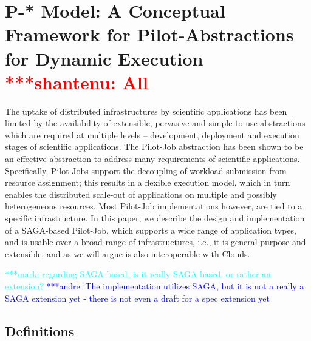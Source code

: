 \documentclass[conference,final]{IEEEtran}
\newcommand{\jhanote}[1]{ {\textcolor{red} { ***shantenu: #1 }}}
\newcommand{\alnote}[1]{ {\textcolor{blue} { ***andre: #1 }}}
\newcommand{\msnote}[1]{ {\textcolor{cyan} { ***mark: #1 }}}
\newcommand{\alnote}[1]{}
\newcommand{\jhanote}[1]{}
\begin{document}



\section{P-* Model: A Conceptual Framework for Pilot-Abstractions for
  Dynamic Execution \jhanote{All}}
\label{sec:pilot-model}

The uptake of distributed infrastructures by scientific applications
has been limited by the availability of extensible, pervasive and
simple-to-use abstractions which are required at multiple levels –
development, deployment and execution stages of scientific
applications. The Pilot-Job abstraction has been shown to be an
effective abstraction to address many requirements of scientific
applications. Specifically, Pilot-Jobs support the decoupling of
workload submission from resource assignment; this results in a
flexible execution model, which in turn enables the distributed
scale-out of applications on multiple and possibly heterogeneous
resources. Most Pilot-Job implementations however, are tied to a
specific infrastructure. In this paper, we describe the design and
implementation of a SAGA-based Pilot-Job, which supports a wide range
of application types, and is usable over a broad range of
infrastructures, i.e., it is general-purpose and extensible, and as we
will argue is also interoperable with Clouds.

\msnote{regarding SAGA-based, is it really SAGA based, or rather an
  extension?}\alnote{The implementation utilizes SAGA, but it is not a
  really a SAGA extension yet - there is not even a draft for a spec
  extension yet}



\subsection{Definitions}
\end{document}
